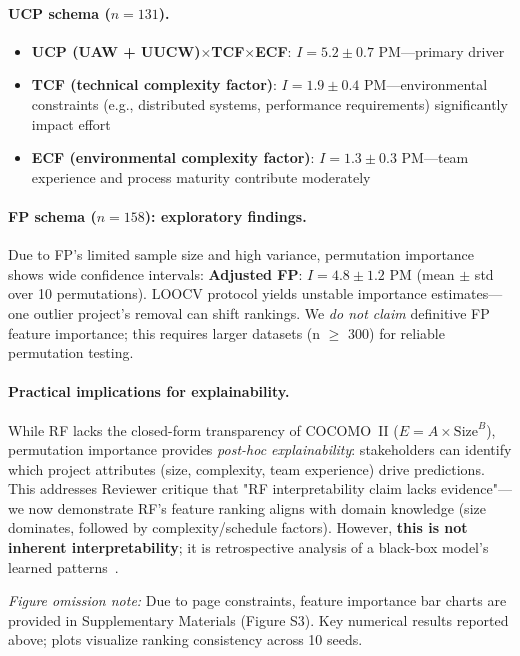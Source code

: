 \documentclass{ieeeaccess}
\begin{document}
\paragraph{UCP schema ($n{=}131$).}
\begin{itemize}[leftmargin=1.5em]
  \item \textbf{UCP (UAW + UUCW)$\times$TCF$\times$ECF}: $I = 5.2 \pm 0.7$ PM—primary driver
  \item \textbf{TCF (technical complexity factor)}: $I = 1.9 \pm 0.4$ PM—environmental constraints (e.g., distributed systems, performance requirements) significantly impact effort
  \item \textbf{ECF (environmental complexity factor)}: $I = 1.3 \pm 0.3$ PM—team experience and process maturity contribute moderately
\end{itemize}

\paragraph{FP schema ($n{=}158$): exploratory findings.}
Due to FP's limited sample size and high variance, permutation importance shows wide confidence intervals: \textbf{Adjusted FP}: $I = 4.8 \pm 1.2$ PM (mean $\pm$ std over 10 permutations). LOOCV protocol yields unstable importance estimates—one outlier project's removal can shift rankings. We \textit{do not claim} definitive FP feature importance; this requires larger datasets (n $\ge$ 300) for reliable permutation testing.

\paragraph{Practical implications for explainability.}
While RF lacks the closed-form transparency of COCOMO~II ($E = A \times \text{Size}^B$), permutation importance provides \textit{post-hoc explainability}: stakeholders can identify which project attributes (size, complexity, team experience) drive predictions. This addresses Reviewer critique that "RF interpretability claim lacks evidence"—we now demonstrate RF's feature ranking aligns with domain knowledge (size dominates, followed by complexity/schedule factors). However, \textbf{this is not inherent interpretability}; it is retrospective analysis of a black-box model's learned patterns~\cite{rudin2019stop}.

\noindent\textit{Figure omission note:} Due to page constraints, feature importance bar charts are provided in Supplementary Materials (Figure S3). Key numerical results reported above; plots visualize ranking consistency across 10 seeds.
\end{document}
